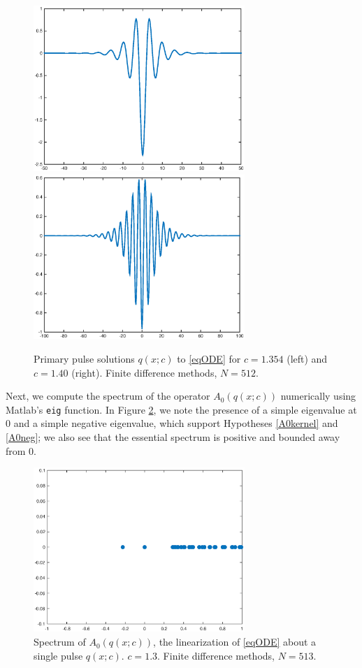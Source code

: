 \documentclass[12pt]{article}
\begin{document}
\begin{figure}[H]
\centering
\includegraphics[width=8cm]{single1354.eps}
\includegraphics[width=8cm]{single14.eps}
\caption{Primary pulse solutions $q(x;c)$ to \eqref{eqODE} for $c = 1.354$ (left) and $c = 1.40$ (right). Finite difference methods, $N = 512$.}
\label{fig:single1}
\end{figure}

Next, we compute the spectrum of the operator $A_0(q(x; c))$ numerically using Matlab's \texttt{eig} function. In Figure \ref{fig:specA0}, we note the presence of a simple eigenvalue at 0 and a simple negative eigenvalue, which support Hypotheses \ref{A0kernel} and \ref{A0neg}; we also see that the essential spectrum is positive and bounded away from 0.

\begin{figure}[H]
\centering
\includegraphics[width=8cm]{specA0.eps}
\caption{Spectrum of $A_0(q(x; c))$, the linearization of \eqref{eqODE} about a single pulse $q(x;c)$. $c = 1.3$. Finite difference methods, $N = 513$.}
\label{fig:specA0}
\end{figure}
\end{document}
